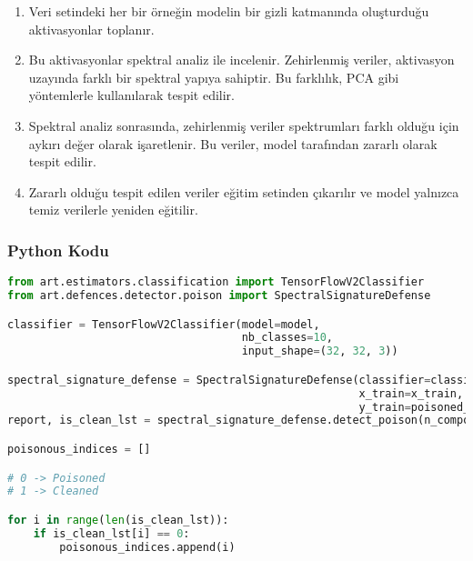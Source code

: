 \begin{enumerate}
    \item Veri setindeki her bir örneğin modelin bir gizli katmanında oluşturduğu aktivasyonlar toplanır.
    \item Bu aktivasyonlar spektral analiz ile incelenir. Zehirlenmiş veriler, aktivasyon uzayında farklı bir spektral yapıya sahiptir. Bu farklılık, PCA gibi yöntemlerle kullanılarak tespit edilir.
    \item Spektral analiz sonrasında, zehirlenmiş veriler spektrumları farklı olduğu için aykırı değer olarak işaretlenir. Bu veriler, model tarafından zararlı olarak tespit edilir.
    \item Zararlı olduğu tespit edilen veriler eğitim setinden çıkarılır ve model yalnızca temiz verilerle yeniden eğitilir.
\end{enumerate}

\subsubsection{Python Kodu}

\begin{lstlisting}[language=Python]
from art.estimators.classification import TensorFlowV2Classifier
from art.defences.detector.poison import SpectralSignatureDefense

classifier = TensorFlowV2Classifier(model=model, 
                                    nb_classes=10, 
                                    input_shape=(32, 32, 3))

spectral_signature_defense = SpectralSignatureDefense(classifier=classifier, 
                                                      x_train=x_train, 
                                                      y_train=poisoned_y_train)
report, is_clean_lst = spectral_signature_defense.detect_poison(n_components=10)

poisonous_indices = []

# 0 -> Poisoned
# 1 -> Cleaned

for i in range(len(is_clean_lst)):
    if is_clean_lst[i] == 0:
        poisonous_indices.append(i)
\end{lstlisting}

\newpage